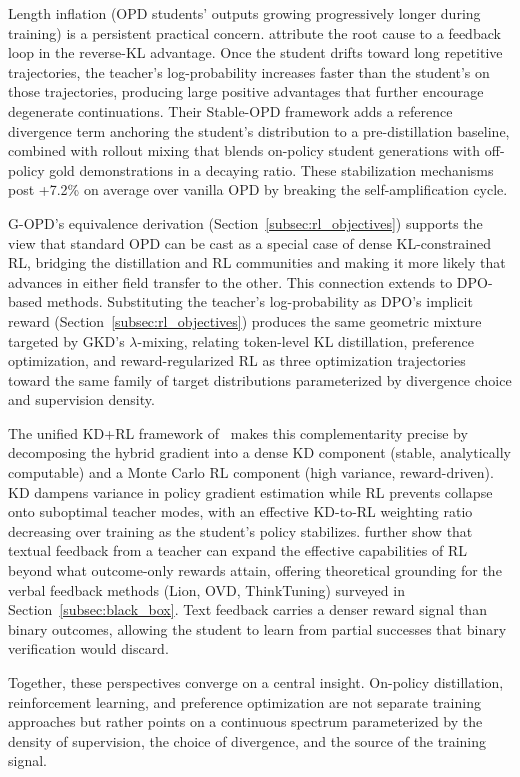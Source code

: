 \documentclass{article} %
\begin{document}
Length inflation (OPD students' outputs growing progressively longer during training) is a persistent practical concern. \citet{luo2026demystifying} attribute the root cause to a feedback loop in the reverse-KL advantage. Once the student drifts toward long repetitive trajectories, the teacher's log-probability increases faster than the student's on those trajectories, producing large positive advantages that further encourage degenerate continuations. Their Stable-OPD framework adds a reference divergence term anchoring the student's distribution to a pre-distillation baseline, combined with rollout mixing that blends on-policy student generations with off-policy gold demonstrations in a decaying ratio. These stabilization mechanisms post +7.2\% on average over vanilla OPD by breaking the self-amplification cycle.

G-OPD's equivalence derivation (Section~\ref{subsec:rl_objectives}) supports the view that standard OPD can be cast as a special case of dense KL-constrained RL, bridging the distillation and RL communities and making it more likely that advances in either field transfer to the other. This connection extends to DPO-based methods. Substituting the teacher's log-probability as DPO's implicit reward (Section~\ref{subsec:rl_objectives}) produces the same geometric mixture targeted by GKD's $\lambda$-mixing, relating token-level KL distillation, preference optimization, and reward-regularized RL as three optimization trajectories toward the same family of target distributions parameterized by divergence choice and supervision density.

The unified KD+RL framework of~\citet{2512.23097} makes this complementarity precise by decomposing the hybrid gradient into a dense KD component (stable, analytically computable) and a Monte Carlo RL component (high variance, reward-driven). KD dampens variance in policy gradient estimation while RL prevents collapse onto suboptimal teacher modes, with an effective KD-to-RL weighting ratio decreasing over training as the student's policy stabilizes. \citet{song2026expanding} further show that textual feedback from a teacher can expand the effective capabilities of RL beyond what outcome-only rewards attain, offering theoretical grounding for the verbal feedback methods (Lion, OVD, ThinkTuning) surveyed in Section~\ref{subsec:black_box}. Text feedback carries a denser reward signal than binary outcomes, allowing the student to learn from partial successes that binary verification would discard.

Together, these perspectives converge on a central insight. On-policy distillation, reinforcement learning, and preference optimization are not separate training approaches but rather points on a continuous spectrum parameterized by the density of supervision, the choice of divergence, and the source of the training signal.
\end{document}
